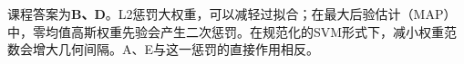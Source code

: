课程答案为\textbf{B、D}。L2惩罚大权重，可以减轻过拟合；在最大后验估计（MAP）中，零均值高斯权重先验会产生二次惩罚。在规范化的SVM形式下，减小权重范数会增大几何间隔。A、E与这一惩罚的直接作用相反。
